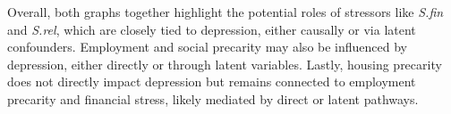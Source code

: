 \documentclass[
]{article}
\begin{document}
Overall, both graphs together highlight the potential roles of stressors
like \emph{S.fin} and \emph{S.rel}, which are closely tied to
depression, either causally or via latent confounders. Employment and
social precarity may also be influenced by depression, either directly
or through latent variables. Lastly, housing precarity does not directly
impact depression but remains connected to employment precarity and
financial stress, likely mediated by direct or latent pathways.

\begin{figure}

\begin{minipage}{0.50\linewidth}



\end{minipage}%
%
\begin{minipage}{0.50\linewidth}

\centering{

}
\end{minipage}
\end{figure}
\end{document}
